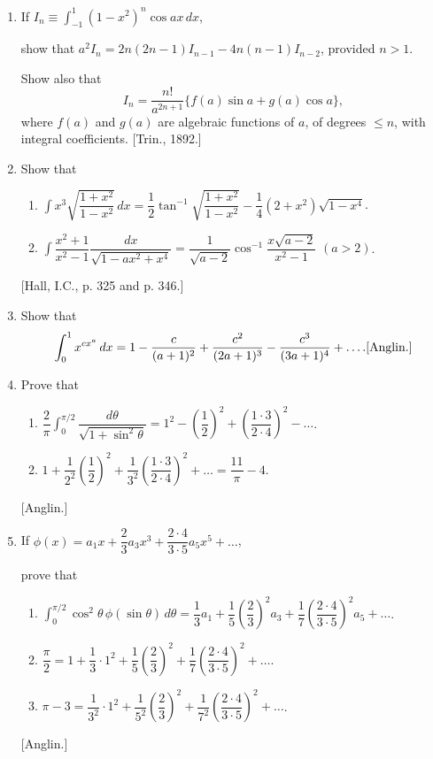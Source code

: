 \documentclass[11pt, a4paper]{article}
\newcommand{\source}[1]{\hfill\textnormal{[#1]}}
\begin{document}
\begin{enumerate}[leftmargin=2em]
\item If $\displaystyle I_n\equiv\int_{-1}^1 (1-x^2)^n\cos ax\,dx$,

show that $a^2I_n=2n(2n-1)I_{n-1}-4n(n-1)I_{n-2}$, provided $n>1$.

Show also that
\[
I_n=\dfrac{n!}{a^{2n+1}}\{f(a)\sin a+g(a)\cos a\},
\]
where $f(a)$ and $g(a)$ are algebraic functions of $a$, of degrees $\leqslant n$, with integral coefficients. \source{Trin., 1892.}

\item Show that
\begin{enumerate}[label=(\roman*)]
\item $\displaystyle\int x^3\sqrt{\dfrac{1+x^2}{1-x^2}}\,dx=\dfrac12\tan^{-1}\sqrt{\dfrac{1+x^2}{1-x^2}}-\dfrac14(2+x^2)\sqrt{1-x^4}$.
\item $\displaystyle\int \dfrac{x^2+1}{x^2-1}\dfrac{dx}{\sqrt{1-ax^2+x^4}}=\dfrac{1}{\sqrt{a-2}}\cos^{-1}\dfrac{x\sqrt{a-2}}{x^2-1}$ \quad $(a>2)$.
\end{enumerate}
\source{Hall, I.C., p. 325 and p. 346.}

\item Show that
\[
\int_0^1 x^{cx^a}\,dx=1-\dfrac{c}{(a+1)^2}+\dfrac{c^2}{(2a+1)^3}-\dfrac{c^3}{(3a+1)^4}+\dots. \source{Anglin.}
\]

\item Prove that
\begin{enumerate}[label=(\roman*)]
\item $\displaystyle\dfrac{2}{\pi}\int_0^{\pi/2} \dfrac{d\theta}{\sqrt{1+\sin^2\theta}}=1^2-\left(\dfrac12\right)^2+\left(\dfrac{1\cdot3}{2\cdot4}\right)^2-\dots$.
\item $\displaystyle1+\dfrac{1}{2^2}\left(\dfrac12\right)^2+\dfrac{1}{3^2}\left(\dfrac{1\cdot3}{2\cdot4}\right)^2+\dots=\dfrac{11}{\pi}-4$.
\end{enumerate}
\source{Anglin.}

\item If $\phi(x)=a_1x+\dfrac23a_3x^3+\dfrac{2\cdot4}{3\cdot5}a_5x^5+\dots$,

prove that
\begin{enumerate}[label=(\roman*)]
\item $\displaystyle\int_0^{\pi/2} \cos^2\theta\,\phi(\sin\theta)\,d\theta=\dfrac13a_1+\dfrac15\left(\dfrac23\right)^2a_3+\dfrac17\left(\dfrac{2\cdot4}{3\cdot5}\right)^2a_5+\dots$.
\item $\displaystyle\dfrac{\pi}{2}=1+\dfrac13\cdot1^2+\dfrac15\left(\dfrac23\right)^2+\dfrac17\left(\dfrac{2\cdot4}{3\cdot5}\right)^2+\dots$.
\item $\displaystyle\pi-3=\dfrac{1}{3^2}\cdot1^2+\dfrac{1}{5^2}\left(\dfrac23\right)^2+\dfrac{1}{7^2}\left(\dfrac{2\cdot4}{3\cdot5}\right)^2+\dots$.
\end{enumerate}
\source{Anglin.}

\end{enumerate}
\end{document}
